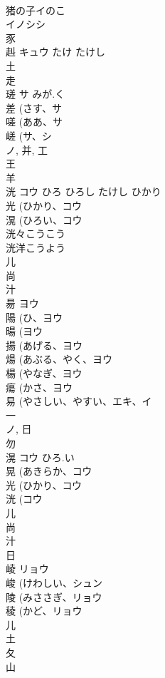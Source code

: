 \documentclass[8pt]{extreport}
\begin{document}
\begin{CJK}{UTF8}{min}
\\	猪の子イのこ 
\\	イノシシ 
\\	豕 
\\	赳	キュウ	たけ たけし	
\\	土 
\\	走 
\\	瑳	サ	みが.く	
\\	差 (さす、サ 
\\	嗟 (ああ、サ 
\\	嵯 (サ、シ 
\\	ノ, 并, 工 
\\	王 
\\	羊 
\\	洸	コウ	ひろ ひろし たけし ひかり	
\\	光 (ひかり、コウ 
\\	滉 (ひろい、コウ 
\\	洸々こうこう
\\	洸洋こうよう
\\	儿 
\\	尚 
\\	汁 
\\	昜	ヨウ		
\\	陽 (ひ、ヨウ 
\\	暘 (ヨウ 
\\	揚 (あげる、ヨウ 
\\	煬 (あぶる、やく、ヨウ 
\\	楊 (やなぎ、ヨウ 
\\	瘍 (かさ、ヨウ 
\\	易 (やさしい、やすい、エキ、イ 
\\	一 
\\	ノ, 日 
\\	勿 
\\	滉	コウ	ひろ.い	
\\	晃 (あきらか、コウ 
\\	光 (ひかり、コウ 
\\	洸 (コウ 
\\	儿 
\\	尚 
\\	汁 
\\	日 
\\	崚	リョウ		
\\	峻 (けわしい、シュン 
\\	陵 (みささぎ、リョウ 
\\	稜 (かど、リョウ 
\\	儿 
\\	土 
\\	夂 
\\	山 
\end{CJK}
\end{document}
